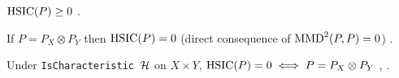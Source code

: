 \begin{thm}
\label{thm:hsic-nonneg}
  \leanok
$\mathrm{HSIC}(P) \ge 0$ \cite{gretton2005hsic}.
\end{thm}

\begin{thm}
\label{thm:hsic-eq-zero-of-indep}
  \leanok
If $P = P_X \otimes P_Y$ then $\mathrm{HSIC}(P) = 0$ (direct consequence of
$\mathrm{MMD}^2(P, P) = 0$) \cite{gretton2005hsic}.
\end{thm}

\begin{thm}
\label{thm:hsic-zero-iff-indep}
  \leanok
Under \texttt{IsCharacteristic}~$\mathcal{H}$ on $X \times Y$,
$\mathrm{HSIC}(P) = 0 \iff P = P_X \otimes P_Y$
\cite[Thm~4]{gretton2005hsic}, \cite[\S4.2]{sriperumbudur2010hilbert}.
\end{thm}
